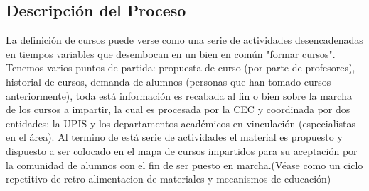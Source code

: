 \subsection{Descripción del Proceso}
	La definición de cursos puede verse como una serie de actividades desencadenadas en tiempos variables que desembocan en un bien en común "formar cursos". Tenemos varios puntos de partida: propuesta de curso (por parte de profesores), historial de cursos, demanda de alumnos (personas que han tomado cursos anteriormente), toda está información es recabada al fin o bien sobre la marcha de los cursos a impartir, la cual es procesada por la CEC y coordinada por dos entidades: la UPIS y los departamentos académicos en vinculación (especialistas en el área). Al termino de está serie de actividades el material es propuesto y dispuesto a ser colocado en el mapa de cursos impartidos para su aceptación por la comunidad de alumnos con el fin de ser puesto en marcha.(Véase como un ciclo repetitivo de retro-alimentacion de materiales y mecanismos de educación)

